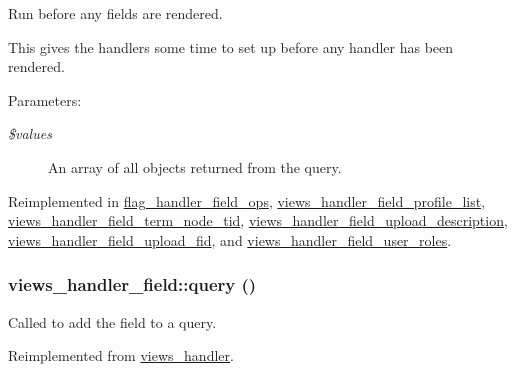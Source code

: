 Run before any fields are rendered.

This gives the handlers some time to set up before any handler has been rendered.

\begin{Desc}
\item[Parameters:]
\begin{description}
\item[{\em \$values}]An array of all objects returned from the query. \end{description}
\end{Desc}


Reimplemented in \hyperlink{classflag__handler__field__ops_5ad942714340d84d5462f3fd928a230c}{flag\_\-handler\_\-field\_\-ops}, \hyperlink{classviews__handler__field__profile__list_8c8d3cb39336f354e35c0b2e5afd25aa}{views\_\-handler\_\-field\_\-profile\_\-list}, \hyperlink{classviews__handler__field__term__node__tid_f3446d6e75ff34c2b165a5513a385c3b}{views\_\-handler\_\-field\_\-term\_\-node\_\-tid}, \hyperlink{classviews__handler__field__upload__description_0890ab0770ad73dc186283a2222d473c}{views\_\-handler\_\-field\_\-upload\_\-description}, \hyperlink{classviews__handler__field__upload__fid_5f4bd6d947086120d041e1e27571804d}{views\_\-handler\_\-field\_\-upload\_\-fid}, and \hyperlink{classviews__handler__field__user__roles_342d1bffbb0098a432ace0f838c63989}{views\_\-handler\_\-field\_\-user\_\-roles}.\hypertarget{classviews__handler__field_4f661f91bcbe80d4a00c30a31456c502}{
\subsubsection[{query}]{\setlength{\rightskip}{0pt plus 5cm}views\_\-handler\_\-field::query ()}}
\label{classviews__handler__field_4f661f91bcbe80d4a00c30a31456c502}


Called to add the field to a query. 

Reimplemented from \hyperlink{classviews__handler_91e22c95696d9fdb9ed753a10d42a21d}{views\_\-handler}.

